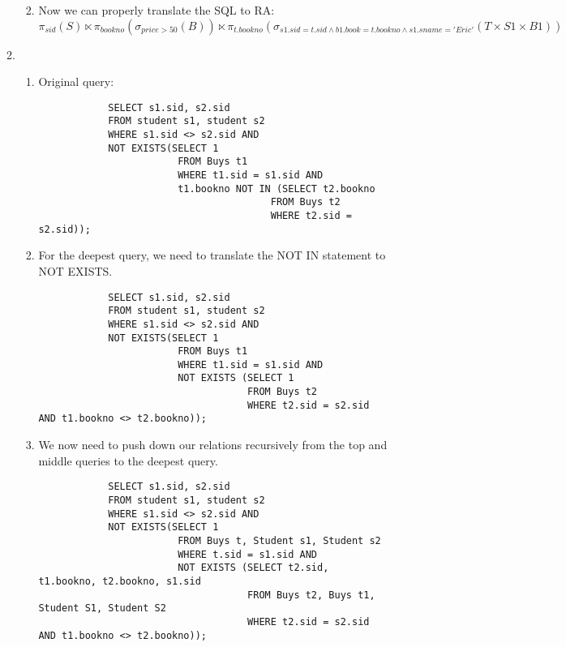 \documentclass{article}
\begin{document}
\begin{enumerate}
\begin{enumerate}
\begin{enumerate}
\begin{lstlisting}
            \end{lstlisting}

            \item Now we can properly translate the SQL to RA:
            \begin{displaymath}
                \pi_{sid}(S) \ltimes
                \pi_{bookno}(\sigma_{price > 50}(B)) \ltimes
                \pi_{t.bookno}(\sigma_{s1.sid=t.sid \wedge b1.book=t.bookno \wedge s1.sname='Eric'}(T \times S1 \times B1)) %
            \end{displaymath}

        \end{enumerate}

        \newpage

        \item %
        \begin{enumerate}

            \item Original query:
            \begin{lstlisting}
            SELECT s1.sid, s2.sid
            FROM student s1, student s2
            WHERE s1.sid <> s2.sid AND
            NOT EXISTS(SELECT 1
                        FROM Buys t1
                        WHERE t1.sid = s1.sid AND
                        t1.bookno NOT IN (SELECT t2.bookno
                                        FROM Buys t2
                                        WHERE t2.sid = s2.sid));
            \end{lstlisting}

            \item For the deepest query, we need to translate the NOT IN statement to NOT EXISTS.
            \begin{lstlisting}
            SELECT s1.sid, s2.sid
            FROM student s1, student s2
            WHERE s1.sid <> s2.sid AND
            NOT EXISTS(SELECT 1
                        FROM Buys t1
                        WHERE t1.sid = s1.sid AND
                        NOT EXISTS (SELECT 1
                                    FROM Buys t2
                                    WHERE t2.sid = s2.sid AND t1.bookno <> t2.bookno));
            \end{lstlisting}

            \item We now need to push down our relations recursively from the top and middle queries to the deepest query.
            \begin{lstlisting}
            SELECT s1.sid, s2.sid
            FROM student s1, student s2
            WHERE s1.sid <> s2.sid AND
            NOT EXISTS(SELECT 1
                        FROM Buys t, Student s1, Student s2
                        WHERE t.sid = s1.sid AND
                        NOT EXISTS (SELECT t2.sid, t1.bookno, t2.bookno, s1.sid
                                    FROM Buys t2, Buys t1, Student S1, Student S2
                                    WHERE t2.sid = s2.sid AND t1.bookno <> t2.bookno));
            \end{lstlisting}


\end{enumerate}
\end{enumerate}
\end{enumerate}
\end{document}
